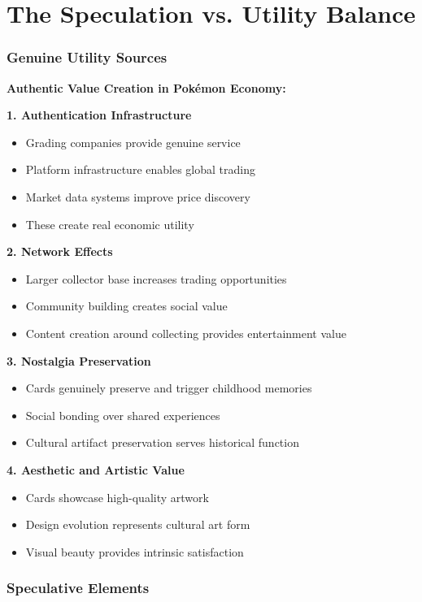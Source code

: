 \documentclass[11pt,oneside]{book}
\begin{document}
{{{{{{\section{The Speculation vs. Utility Balance}

\subsubsection{Genuine Utility Sources}

\textbf{Authentic Value Creation in Pokémon Economy:}

\textbf{1. Authentication Infrastructure}
\begin{itemize}
\item Grading companies provide genuine service
\item Platform infrastructure enables global trading
\item Market data systems improve price discovery
\item These create real economic utility
\end{itemize}

\textbf{2. Network Effects}
\begin{itemize}
\item Larger collector base increases trading opportunities
\item Community building creates social value
\item Content creation around collecting provides entertainment value
\end{itemize}

\textbf{3. Nostalgia Preservation}
\begin{itemize}
\item Cards genuinely preserve and trigger childhood memories
\item Social bonding over shared experiences
\item Cultural artifact preservation serves historical function
\end{itemize}

\textbf{4. Aesthetic and Artistic Value}
\begin{itemize}
\item Cards showcase high-quality artwork
\item Design evolution represents cultural art form
\item Visual beauty provides intrinsic satisfaction
\end{itemize}

\subsubsection{Speculative Elements}

}}}}}}
\end{document}
